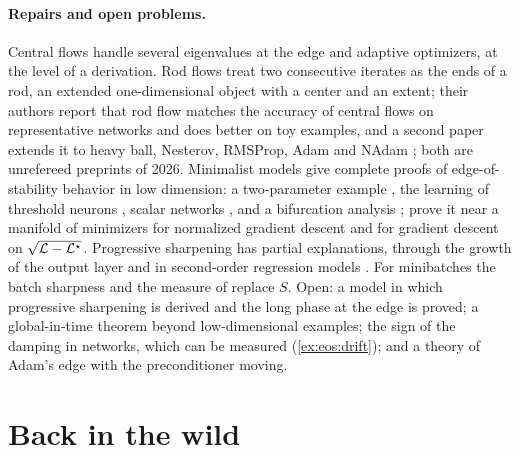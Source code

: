 \begin{refsection}
\paragraph{Repairs and open problems.} Central flows \parencite{CohenEtAl2025} handle several eigenvalues at the edge and adaptive optimizers, at the level of a derivation. Rod flows \parencite{RegisChewi2026} treat two consecutive iterates as the ends of a rod, an extended one-dimensional object with a center and an extent; their authors report that rod flow matches the accuracy of central flows on representative networks and does better on toy examples, and a second paper extends it to heavy ball, Nesterov, RMSProp, Adam and NAdam \parencite{RegisChewi2026Adam}; both are unrefereed preprints of 2026. Minimalist models give complete proofs of edge-of-stability behavior in low dimension: a two-parameter example \parencite{ZhuEtAl2023}, the learning of threshold neurons \parencite{AhnEtAl2023}, scalar networks \parencite{KreislerEtAl2023}, and a bifurcation analysis \parencite{SongYun2023}; \textcite{AroraLiPanigrahi2022} prove it near a manifold of minimizers for normalized gradient descent and for gradient descent on $\sqrt{\mathcal{L}-\mathcal{L}^\star}$. Progressive sharpening has partial explanations, through the growth of the output layer \parencite{LiWangLi2022} and in second-order regression models \parencite{AgarwalaPedregosaPennington2023}. For minibatches the batch sharpness \parencite{AndreyevBeneventano2024} and the measure of \textcite{LeeJang2023} replace $S$. Open: a model in which progressive sharpening is derived and the long phase at the edge is proved; a global-in-time theorem beyond low-dimensional examples; the sign of the damping in networks, which can be measured (\cref{ex:eos:drift}); and a theory of Adam's edge with the preconditioner moving.

\section{Back in the wild}\label{sec:eos:back}


\end{refsection}

